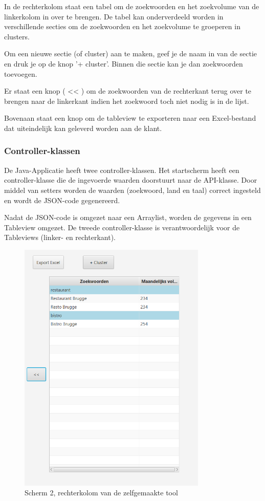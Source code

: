 In de rechterkolom staat een tabel om de zoekwoorden en het zoekvolume van de linkerkolom in over te brengen. De tabel kan onderverdeeld worden in verschillende secties om de zoekwoorden en het zoekvolume te groeperen in clusters. 

Om een nieuwe sectie (of cluster) aan te maken, geef je de naam in van de sectie en druk je op de knop '+ cluster'. Binnen die sectie kan je dan zoekwoorden toevoegen.

Er staat een knop ( << ) om de zoekwoorden van de rechterkant terug over te brengen naar de linkerkant indien het zoekwoord toch niet nodig is in de lijst. 

Bovenaan staat een knop om de tableview te exporteren naar een Excel-bestand dat uiteindelijk kan geleverd worden aan de klant. 


\subsubsection{Controller-klassen}
\label{ch: Controller-klassen}

De Java-Applicatie heeft twee controller-klassen. Het startscherm heeft een controller-klasse die de ingevoerde waarden doorstuurt naar de API-klasse. Door middel van setters worden de waarden (zoekwoord, land en taal) correct ingesteld en wordt de JSON-code gegenereerd. 

Nadat de JSON-code is omgezet naar een Arraylist, worden de gegevens in een Tableview omgezet. De tweede controller-klasse is verantwoordelijk voor de Tableviews (linker- en rechterkant). 

\begin{figure}[h!]
\centering
\includegraphics[width=0.8\textwidth]{img/scherm2rechterkant.PNG}
\caption{Scherm 2, rechterkolom van de zelfgemaakte tool}
\end{figure}